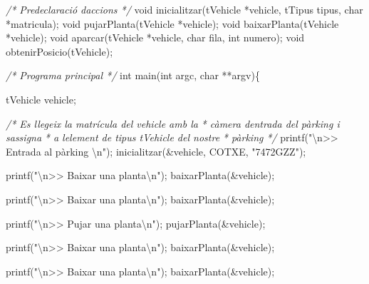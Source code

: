 \documentclass[
]{book}
\newenvironment{Shaded}{\begin{snugshade}}{\end{snugshade}}
\newcommand{\CommentTok}[1]{\textcolor[rgb]{0.56,0.35,0.01}{\textit{#1}}}
\newcommand{\DataTypeTok}[1]{\textcolor[rgb]{0.13,0.29,0.53}{#1}}
\newcommand{\NormalTok}[1]{#1}
\newcommand{\SpecialCharTok}[1]{\textcolor[rgb]{0.00,0.00,0.00}{#1}}
\newcommand{\StringTok}[1]{\textcolor[rgb]{0.31,0.60,0.02}{#1}}
\begin{document}
\begin{Shaded}
\begin{Highlighting}[]
\CommentTok{/* Predeclaració d\textquotesingle{}accions */}
\DataTypeTok{void}\NormalTok{ inicialitzar(tVehicle *vehicle, tTipus tipus, }\DataTypeTok{char}\NormalTok{ *matricula);}
\DataTypeTok{void}\NormalTok{ pujarPlanta(tVehicle *vehicle);}
\DataTypeTok{void}\NormalTok{ baixarPlanta(tVehicle *vehicle);}
\DataTypeTok{void}\NormalTok{ aparcar(tVehicle *vehicle, }\DataTypeTok{char}\NormalTok{ fila, }\DataTypeTok{int}\NormalTok{ numero);}
\DataTypeTok{void}\NormalTok{ obtenirPosicio(tVehicle);}

\CommentTok{/* Programa principal */}
\DataTypeTok{int}\NormalTok{ main(}\DataTypeTok{int}\NormalTok{ argc, }\DataTypeTok{char}\NormalTok{ **argv)\{}
    
\NormalTok{    tVehicle vehicle;}
    
    \CommentTok{/* Es llegeix la matrícula del vehicle amb la }
\CommentTok{     * càmera d\textquotesingle{}entrada del pàrking i s\textquotesingle{}assigna}
\CommentTok{     * a l\textquotesingle{}element de tipus tVehicle del nostre}
\CommentTok{     * pàrking }
\CommentTok{     */}
\NormalTok{    printf(}\StringTok{"}\SpecialCharTok{\textbackslash{}n}\StringTok{\textgreater{}\textgreater{} Entrada al pàrking }\SpecialCharTok{\textbackslash{}n}\StringTok{"}\NormalTok{);}
\NormalTok{    inicialitzar(\&vehicle, COTXE, }\StringTok{"7472GZZ"}\NormalTok{);}
    
\NormalTok{    printf(}\StringTok{"}\SpecialCharTok{\textbackslash{}n}\StringTok{\textgreater{}\textgreater{} Baixar una planta}\SpecialCharTok{\textbackslash{}n}\StringTok{"}\NormalTok{);}
\NormalTok{    baixarPlanta(\&vehicle);}
    
\NormalTok{    printf(}\StringTok{"}\SpecialCharTok{\textbackslash{}n}\StringTok{\textgreater{}\textgreater{} Baixar una planta}\SpecialCharTok{\textbackslash{}n}\StringTok{"}\NormalTok{);}
\NormalTok{    baixarPlanta(\&vehicle);}
    
\NormalTok{    printf(}\StringTok{"}\SpecialCharTok{\textbackslash{}n}\StringTok{\textgreater{}\textgreater{} Pujar una planta}\SpecialCharTok{\textbackslash{}n}\StringTok{"}\NormalTok{);}
\NormalTok{    pujarPlanta(\&vehicle);}
    
\NormalTok{    printf(}\StringTok{"}\SpecialCharTok{\textbackslash{}n}\StringTok{\textgreater{}\textgreater{} Baixar una planta}\SpecialCharTok{\textbackslash{}n}\StringTok{"}\NormalTok{);}
\NormalTok{    baixarPlanta(\&vehicle);}
    
\NormalTok{    printf(}\StringTok{"}\SpecialCharTok{\textbackslash{}n}\StringTok{\textgreater{}\textgreater{} Baixar una planta}\SpecialCharTok{\textbackslash{}n}\StringTok{"}\NormalTok{);}
\NormalTok{    baixarPlanta(\&vehicle);}
    

\end{Highlighting}
\end{Shaded}
\end{document}
